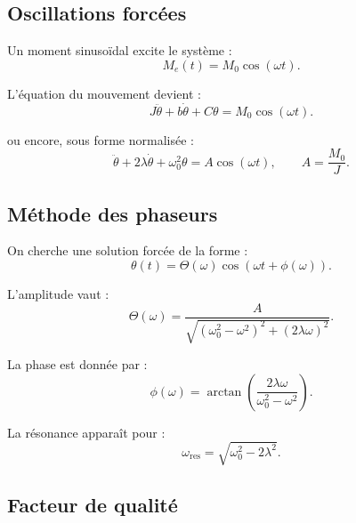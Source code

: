 \subsection{Oscillations forcées} \label{subsec:osc_forcees}

Un moment sinusoïdal excite le système :
\begin{equation}
M_e(t) = M_0\cos(\omega t).
\label{eq:moment_excitation}
\end{equation}

L’équation du mouvement devient :
\begin{equation}
J\ddot{\theta} + b\dot{\theta} + C\theta = M_0\cos(\omega t).
\label{eq:equa_forcee_brut}
\end{equation}

ou encore, sous forme normalisée :
\begin{equation}
\ddot{\theta}+2\lambda\dot{\theta}+\omega_0^2\theta
= A\cos(\omega t), \qquad A=\frac{M_0}{J}.
\label{eq:equa_forcee_normalisee}
\end{equation}


\subsection{Méthode des phaseurs} \label{subsec:phaseurs}

On cherche une solution forcée de la forme :
\begin{equation}
\theta(t)=\Theta(\omega)\cos(\omega t+\phi(\omega)).
\label{eq:solution_phaseurs}
\end{equation}

L’amplitude vaut :
\begin{equation}
\Theta(\omega)
=\frac{A}{\sqrt{(\omega_0^2-\omega^2)^2+(2\lambda\omega)^2}}.
\label{eq:amplitude_forcee}
\end{equation}

La phase est donnée par :
\begin{equation}
\phi(\omega)
=\arctan\left(\frac{2\lambda\omega}{\omega_0^2-\omega^2}\right).
\label{eq:phase_forcee}
\end{equation}

La résonance apparaît pour :
\begin{equation}
\omega_{\mathrm{res}}=\sqrt{\omega_0^2 - 2\lambda^2}.
\label{eq:omega_res}
\end{equation}


\subsection{Facteur de qualité} \label{subsec:facteur_Q}

